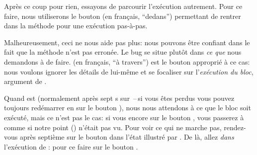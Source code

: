 \documentclass[a4paper,10pt,twoside]{book}
\begin{document}

Après ce coup pour rien, essayons de parcourir l'exécution autrement. Pour ce faire, nous utiliserons le bouton  (en français, ``dedans'') permettant de rentrer dans la méthode pour une exécution pas-à-pas.


Malheureusement, ceci ne nous aide pas plus: nous pouvons être confiant
dans le fait que la méthode  n'est pas erronée. 
Le bug se situe plutôt dans \emph{ce que} nous demandons à \pharo de faire.
 (en français, ``à travers'') est le bouton approprié à ce cas: nous
voulons ignorer les détails de  lui-même et se focaliser sur
l'\emph{exécution du bloc}, argument de .


Quand  est  
(normalement après sept \clickbtn{}s sur \,--\,si vous êtes perdus vous pouvez toujours redémarrer en \clickant{} sur le bouton ),
nous nous attendons à ce que le bloc  soit exécuté, mais ce n'est pas le cas:
si vous \clickz{} encore sur le bouton , vous passerez à  comme
si notre point () n'était pas vu.
Pour voir ce qui ne marche pas, rendez-vous
après septième \clickbtn sur le bouton  dans l'état illustré par
. De là, allez \emph{dans} l'exécution de 
:
\clickz{} pour ce faire sur le bouton .
\end{document}
